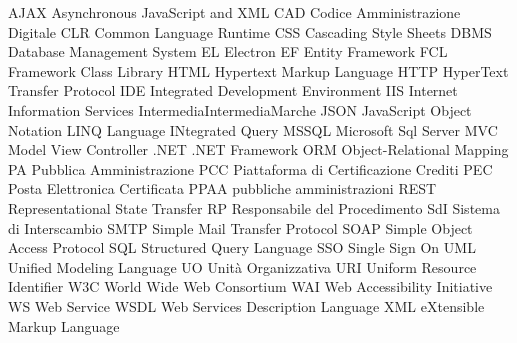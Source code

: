 
   {AJAX}      {Asynchronous JavaScript and XML}
    {CAD}       {Codice Amministrazione Digitale}
    {CLR}       {Common Language Runtime}
    {CSS}       {Cascading Style Sheets}
   {DBMS}      {Database Management System}
     {EL}        {Electron}
     {EF}        {Entity Framework}
    {FCL}       {Framework Class Library}
   {HTML}      {Hypertext Markup Language}
   {HTTP}      {HyperText Transfer Protocol}
    {IDE}       {Integrated Development Environment}
    {IIS}       {Internet Information Services}
    {Intermedia}{IntermediaMarche}
   {JSON}      {JavaScript Object Notation}
   {LINQ}      {Language INtegrated Query}
  {MSSQL}     {Microsoft Sql Server}
    {MVC}       {Model View Controller}
    {.NET}      {.NET Framework}
    {ORM}       {Object-Relational Mapping}
     {PA}        {Pubblica Amministrazione}
    {PCC}       {Piattaforma di Certificazione Crediti}
    {PEC}       {Posta Elettronica Certificata}
   {PPAA}      {pubbliche amministrazioni}
   {REST}      {Representational State Transfer}
     {RP}        {Responsabile del Procedimento}
    {SdI}       {Sistema di Interscambio}
   {SMTP}      {Simple Mail Transfer Protocol}
   {SOAP}      {Simple Object Access Protocol}
    {SQL}       {Structured Query Language}
    {SSO}       {Single Sign On}
    {UML}       {Unified Modeling Language}
     {UO}        {Unità Organizzativa}
    {URI}       {Uniform Resource Identifier}
    {W3C}       {World Wide Web Consortium}
    {WAI}       {Web Accessibility Initiative}
     {WS}        {Web Service}
   {WSDL}      {Web Services Description Language}
    {XML}       {eXtensible Markup Language}